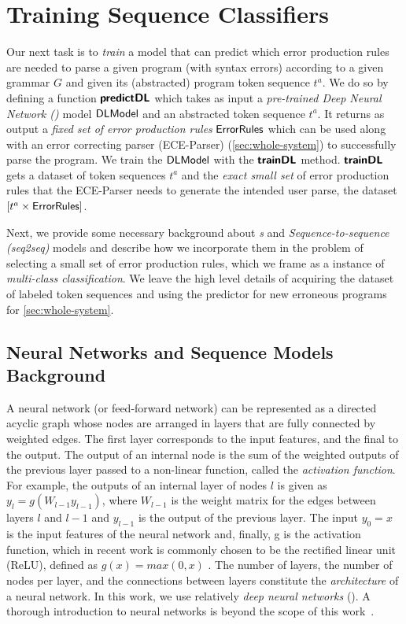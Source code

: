 \section{Training Sequence Classifiers}
\label{sec:seq-classifiers}

Our next task is to \emph{train} a model that can predict which error production
rules are needed to parse a given program (with syntax errors) according to a
given grammar $G$ and given its (abstracted) program token sequence $t^a$.
%
We do so by defining a function $\bm{\mathsf{predictDL}}$ which takes as input a
\emph{pre-trained Deep Neural Network (\dnn)} model $\mathsf{DLModel}$ and an abstracted
token sequence $t^a$.
%
It returns as output a \emph{fixed set of error production rules}
$\mathsf{ErrorRules}$ which can be used along with an error correcting parser
(ECE-Parser) (\autoref{sec:whole-system}) to successfully parse the program.
%
We train the $\mathsf{DLModel}$ with the $\bm{\mathsf{trainDL}}$ method. $\bm{\mathsf{trainDL}}$ gets a
dataset of token sequences $t^a$ and the \emph{exact small set} of error
production rules that the ECE-Parser needs to generate the intended user parse,
\ie the dataset $[t^a \times \mathsf{ErrorRules}]$.

Next, we provide some necessary background about \emph{\dnn{}s} and
\emph{Sequence-to-sequence (seq2seq)} models and describe how we incorporate
them in the problem of selecting a small set of error production rules, which we
frame as a instance of \emph{multi-class classification}. We leave the high
level details of acquiring the dataset of labeled token sequences and using the
predictor for new erroneous programs for \autoref{sec:whole-system}.

\subsection{Neural Networks and Sequence Models Background}
\label{sec:seq-classifiers:background}

A neural network (or feed-forward network) can be represented as a directed
acyclic graph whose nodes are arranged in layers that are fully connected by
weighted edges. The first layer corresponds to the input features, and the final
to the output. The output of an internal node is the sum of the weighted outputs
of the previous layer passed to a non-linear function, called the
\emph{activation function}. For example, the outputs of an internal layer of
nodes $l$ is given as $y_l = g(W_{l-1} y_{l-1})$, where $W_{l-1}$ is the weight
matrix for the edges between layers $l$ and $l-1$ and $y_{l-1}$ is the output of
the previous layer. The input $y_0 = x$ is the input features of the neural
network and, finally, g is the activation function, which in recent work is
commonly chosen to be the rectified linear unit (ReLU), defined as $g(x) =
max(0, x)$ \citep{Nair2010-xg}.  The number of layers, the number of nodes per
layer, and the connections between layers constitute the \emph{architecture} of
a neural network. In this work, we use relatively \emph{deep neural networks}
(\dnn). A thorough introduction to neural networks is beyond the scope of this
work~\citep{Hastie2009-bn, Nielsen2015-pu}.

